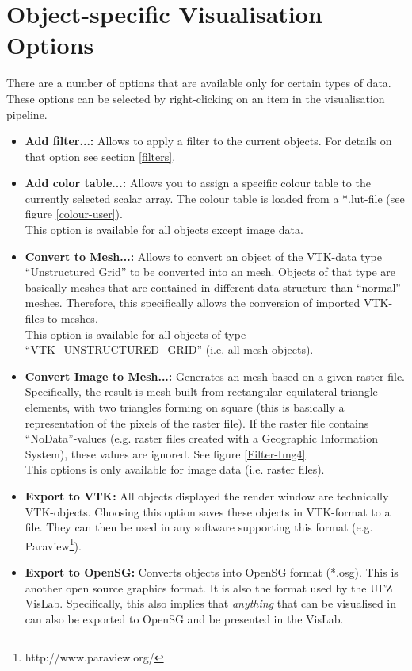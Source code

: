 \section{Object-specific Visualisation Options}
\label{specvisoptions}

There are a number of options that are available only for certain types of data. These options can be selected by right-clicking on an item in the visualisation pipeline.

\begin{itemize}
\item \textbf{Add filter...:} Allows to apply a filter to the current objects. For details on that option see section \ref{filters}.
\item \textbf{Add color table...:} Allows you to assign a specific colour table to the currently selected scalar array. The colour table is loaded from a *.lut-file (see figure \ref{colour-user}).\\
    This option is available for all objects except image data.
\item \textbf{Convert to Mesh...:} Allows to convert an object of the VTK-data type ``Unstructured Grid'' to be converted into an \ogs mesh. Objects of that type are basically meshes that are contained in different data structure than ``normal'' \ogs meshes. Therefore, this specifically allows the conversion of imported VTK-files to \ogs meshes.\\
    This option is available for all objects of type ``VTK\_UN\-STRUCT\-URED\_GRID'' (i.e. all mesh objects).
\item \textbf{Convert Image to Mesh...:} Generates an \ogs mesh based on a given raster file. Specifically, the result is mesh built from rectangular equilateral triangle elements, with two triangles forming on square (this is basically a representation of the pixels of the raster file). If the raster file contains ``NoData''-values (e.g. raster files created with a Geographic Information System), these values are ignored. See figure \ref{Filter-Img4}.\\
    This options is only available for image data (i.e. raster files).
\item \textbf{Export to VTK:} All objects displayed the render window are technically VTK-objects. Choosing this option saves these objects in VTK-format to a file. They can then be used in any software supporting this format (e.g. Paraview\footnote{http://www.paraview.org/}).
\item \textbf{Export to OpenSG:} Converts objects into OpenSG format (*.osg). This is another open source graphics format. It is also the format used by the UFZ VisLab. Specifically, this also implies that \emph{anything} that can be visualised in \ogs can also be exported to OpenSG and be presented in the VisLab.
\end{itemize}

